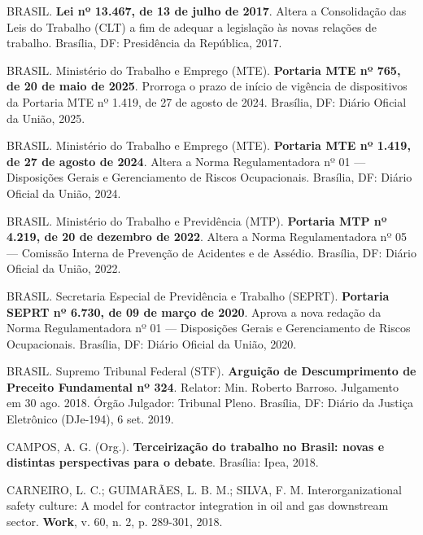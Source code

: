 \documentclass[12pt,a4paper]{article}
\begin{document}
\vspace{0.25cm}
\noindent BRASIL. \textbf{Lei nº 13.467, de 13 de julho de 2017}. Altera a Consolidação das Leis do Trabalho (CLT) a fim de adequar a legislação às novas relações de trabalho. Brasília, DF: Presidência da República, 2017.

\vspace{0.25cm}
\noindent BRASIL. Ministério do Trabalho e Emprego (MTE). \textbf{Portaria MTE nº 765, de 20 de maio de 2025}. Prorroga o prazo de início de vigência de dispositivos da Portaria MTE nº 1.419, de 27 de agosto de 2024. Brasília, DF: Diário Oficial da União, 2025.

\vspace{0.25cm}
\noindent BRASIL. Ministério do Trabalho e Emprego (MTE). \textbf{Portaria MTE nº 1.419, de 27 de agosto de 2024}. Altera a Norma Regulamentadora nº 01 — Disposições Gerais e Gerenciamento de Riscos Ocupacionais. Brasília, DF: Diário Oficial da União, 2024.

\vspace{0.25cm}
\noindent BRASIL. Ministério do Trabalho e Previdência (MTP). \textbf{Portaria MTP nº 4.219, de 20 de dezembro de 2022}. Altera a Norma Regulamentadora nº 05 — Comissão Interna de Prevenção de Acidentes e de Assédio. Brasília, DF: Diário Oficial da União, 2022.

\vspace{0.25cm}
\noindent BRASIL. Secretaria Especial de Previdência e Trabalho (SEPRT). \textbf{Portaria SEPRT nº 6.730, de 09 de março de 2020}. Aprova a nova redação da Norma Regulamentadora nº 01 — Disposições Gerais e Gerenciamento de Riscos Ocupacionais. Brasília, DF: Diário Oficial da União, 2020.

\vspace{0.25cm}
\noindent BRASIL. Supremo Tribunal Federal (STF). \textbf{Arguição de Descumprimento de Preceito Fundamental nº 324}. Relator: Min. Roberto Barroso. Julgamento em 30 ago. 2018. Órgão Julgador: Tribunal Pleno. Brasília, DF: Diário da Justiça Eletrônico (DJe-194), 6 set. 2019.

\vspace{0.25cm}
\noindent CAMPOS, A. G. (Org.). \textbf{Terceirização do trabalho no Brasil: novas e distintas perspectivas para o debate}. Brasília: Ipea, 2018.

\vspace{0.25cm}
\noindent CARNEIRO, L. C.; GUIMARÃES, L. B. M.; SILVA, F. M. Interorganizational safety culture: A model for contractor integration in oil and gas downstream sector. \textbf{Work}, v. 60, n. 2, p. 289-301, 2018.
\end{document}
